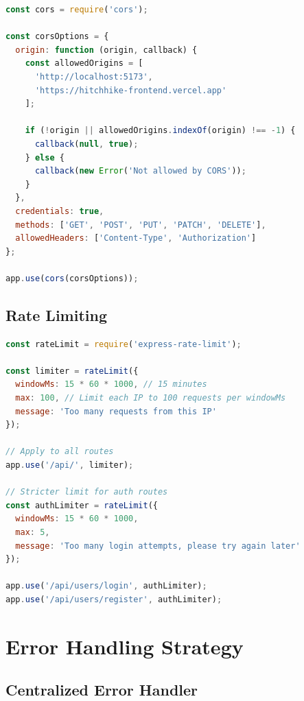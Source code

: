 \documentclass[12pt,a4paper]{article}
\begin{document}
\begin{lstlisting}[language=JavaScript, caption=Cross-Origin Resource Sharing Setup]
const cors = require('cors');

const corsOptions = {
  origin: function (origin, callback) {
    const allowedOrigins = [
      'http://localhost:5173',
      'https://hitchhike-frontend.vercel.app'
    ];
    
    if (!origin || allowedOrigins.indexOf(origin) !== -1) {
      callback(null, true);
    } else {
      callback(new Error('Not allowed by CORS'));
    }
  },
  credentials: true,
  methods: ['GET', 'POST', 'PUT', 'PATCH', 'DELETE'],
  allowedHeaders: ['Content-Type', 'Authorization']
};

app.use(cors(corsOptions));
\end{lstlisting}

\subsection{Rate Limiting}

\begin{lstlisting}[language=JavaScript, caption=API Rate Limiting]
const rateLimit = require('express-rate-limit');

const limiter = rateLimit({
  windowMs: 15 * 60 * 1000, // 15 minutes
  max: 100, // Limit each IP to 100 requests per windowMs
  message: 'Too many requests from this IP'
});

// Apply to all routes
app.use('/api/', limiter);

// Stricter limit for auth routes
const authLimiter = rateLimit({
  windowMs: 15 * 60 * 1000,
  max: 5,
  message: 'Too many login attempts, please try again later'
});

app.use('/api/users/login', authLimiter);
app.use('/api/users/register', authLimiter);
\end{lstlisting}

\newpage

\section{Error Handling Strategy}

\subsection{Centralized Error Handler}
\end{document}
